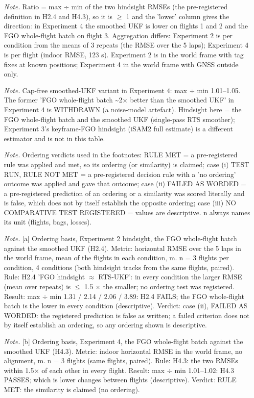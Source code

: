\begin{table}[htbp]
\textit{Note.} Ratio = max $\div$ min of the two hindsight RMSEs (the pre-registered definition in H2.4 and H4.3), so it is $\ge$ 1 and the 'lower' column gives the direction: in Experiment 4 the smoothed UKF is lower on flights 1 and 2 and the FGO whole-flight batch on flight 3. Aggregation differs: Experiment 2 is per condition from the means of 3 repeats (the RMSE over the 5 laps); Experiment 4 is per flight (indoor RMSE, 123 s). Experiment 2 is in the world frame with tag fixes at known positions; Experiment 4 in the world frame with GNSS outside only.\par
\textit{Note.} Cap-free smoothed-UKF variant in Experiment 4: max $\div$ min 1.01--1.05. The former 'FGO whole-flight batch \textasciitilde{}2$\times$ better than the smoothed UKF' in Experiment 4 is WITHDRAWN (a noise-model artefact). Hindsight here = the FGO whole-flight batch and the smoothed UKF (single-pass RTS smoother); Experiment 3's keyframe-FGO hindsight (iSAM2 full estimate) is a different estimator and is not in this table.\par
\textit{Note.} Ordering verdicts used in the footnotes: RULE MET = a pre-registered rule was applied and met, so its ordering (or similarity) is claimed; case (i) TEST RUN, RULE NOT MET = a pre-registered decision rule with a 'no ordering' outcome was applied and gave that outcome; case (ii) FAILED AS WORDED = a pre-registered prediction of an ordering or a similarity was scored literally and is false, which does not by itself establish the opposite ordering; case (iii) NO COMPARATIVE TEST REGISTERED = values are descriptive. n always names its unit (flights, bags, losses).\par
\textit{Note.} [a] Ordering basis, Experiment 2 hindsight, the FGO whole-flight batch against the smoothed UKF (H2.4). Metric: horizontal RMSE over the 5 laps in the world frame, mean of the flights in each condition, m. n = 3 flights per condition, 4 conditions (both hindsight tracks from the same flights, paired). Rule: H2.4 'FGO hindsight $\approx$ RTS-UKF': in every condition the larger RMSE (mean over repeats) is $\le$ 1.5 $\times$ the smaller; no ordering test was registered. Result: max $\div$ min 1.31 / 2.14 / 2.06 / 3.89: H2.4 FAILS; the FGO whole-flight batch is the lower in every condition (descriptive). Verdict: case (ii), FAILED AS WORDED: the registered prediction is false as written; a failed criterion does not by itself establish an ordering, so any ordering shown is descriptive.\par
\textit{Note.} [b] Ordering basis, Experiment 4, the FGO whole-flight batch against the smoothed UKF (H4.3). Metric: indoor horizontal RMSE in the world frame, no alignment, m. n = 3 flights (same flights, paired). Rule: H4.3: the two RMSEs within 1.5$\times$ of each other in every flight. Result: max $\div$ min 1.01--1.02: H4.3 PASSES; which is lower changes between flights (descriptive). Verdict: RULE MET: the similarity is claimed (no ordering).\par

\end{table}
